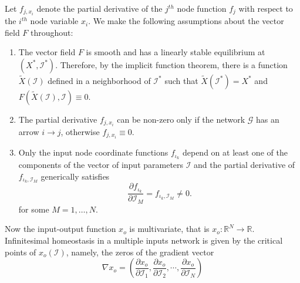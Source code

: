 \documentclass[pdflatex,sn-basic,Numbered]{sn-jnl}
\theoremstyle{thmstyleone}%
\numberwithin{equation}{section}
\begin{document}
Let $f_{j,x_i}$ denote the partial derivative of the $j^{th}$ node function $f_j$ with respect to the $i^{th}$ node variable $x_i$.  We make the following assumptions about the vector field $F$ throughout:
\begin{enumerate}[label=(\alph*)]
\item The vector field $F$ is smooth and has a linearly stable equilibrium at $(X^*,\mathcal{I}^*)$.
Therefore, by the implicit function theorem, there is a function $\tilde{X}(\mathcal{I})$ defined in a neighborhood of $\mathcal{I}^*$ such that $\tilde{X}(\mathcal{I}^*) = X^*$ and $F(\tilde{X}(\mathcal{I}), \mathcal{I}) \equiv 0$. 
\item The partial derivative $f_{j,x_i}$ can be non-zero only if the network $\mathcal{G}$ has an arrow $i\to j$, otherwise $f_{j,x_i} \equiv 0$.
\item Only the input node coordinate functions $f_{\iota_k}$ depend on at least one of the components of the vector of input parameters $\mathcal{I}$ and the partial derivative of $f_{\iota_k,\mathcal{I}_{M}}$ generically satisfies
\begin{equation} \label{e:f_iota_II}
 \frac{\partial f_{\iota_{k}}}{\partial \mathcal{I}_{M}} = f_{\iota_k,\mathcal{I}_{M}} \neq 0.
\end{equation}
for some $M = 1, \ldots, N$.
\end{enumerate}

Now the input-output function $x_o$ is multivariate, that is $x_o:\mathbb{R}^N\to\mathbb{R}$.
Infinitesimal homeostasis in a multiple inputs network is given by the critical points of $x_o(\mathcal{I})$, namely, the zeros of the gradient vector
\begin{equation} \label{gradient_vector}
    \nabla x_{o} = \left(\frac{\partial x_{o}}{\partial \mathcal{I}_{1}}, \frac{\partial x_{o}}{\partial \mathcal{I}_{2}}, \cdots, \frac{\partial x_{o}}{\partial \mathcal{I}_{N}} \right)
\end{equation}
\end{document}
